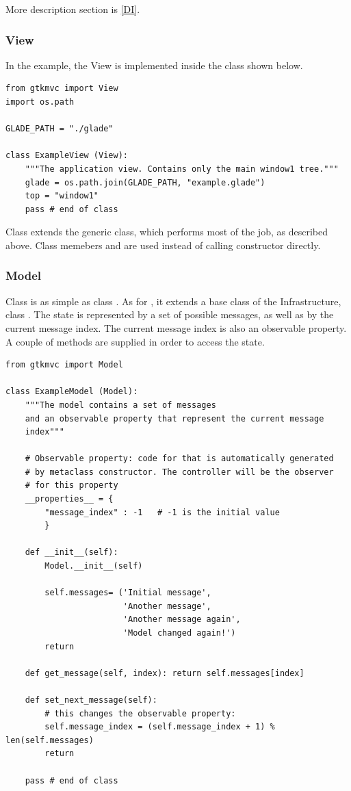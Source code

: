 More description section is \ref{DI}.


\subsubsection{View}
In the example, the View is implemented inside the class
 shown below.

{ \codesize 
\begin{verbatim}  
from gtkmvc import View
import os.path

GLADE_PATH = "./glade" 

class ExampleView (View):
    """The application view. Contains only the main window1 tree."""
    glade = os.path.join(GLADE_PATH, "example.glade")
    top = "window1"
    pass # end of class
\end{verbatim}}

Class  extends the generic 
class, which performs most of the job, as described above.
Class memebers  and  are used instead of 
calling  constructor directly. 

\subsubsection{Model}
Class  is as simple as class
.  As for , it extends a
base class of the \mvco Infrastructure, class .  The
state is represented by a set of possible messages, as well as by the
current message index. The current message index is also an
observable property. A couple of methods are supplied in order to
access the state.

{ \codesize 
\begin{verbatim} 
from gtkmvc import Model

class ExampleModel (Model):
    """The model contains a set of messages
    and an observable property that represent the current message
    index"""

    # Observable property: code for that is automatically generated
    # by metaclass constructor. The controller will be the observer
    # for this property
    __properties__ = {
        "message_index" : -1   # -1 is the initial value
        }

    def __init__(self):
        Model.__init__(self)

        self.messages= ('Initial message',
                        'Another message', 
                        'Another message again',
                        'Model changed again!')
        return

    def get_message(self, index): return self.messages[index]

    def set_next_message(self):
        # this changes the observable property:
        self.message_index = (self.message_index + 1) % len(self.messages)
        return

    pass # end of class

\end{verbatim}
}

